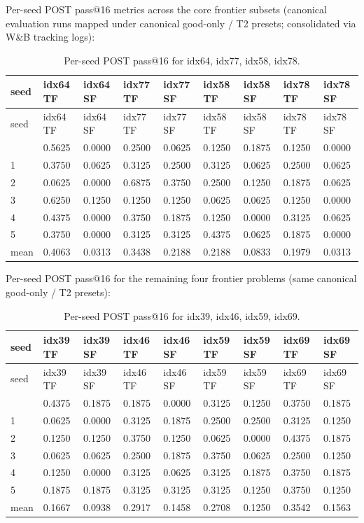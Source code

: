 Per-seed POST pass@16 metrics across the core frontier subsets (canonical evaluation runs mapped under canonical good-only / T2 presets; consolidated via W\&B tracking logs):

\begingroup\setlength{\tabcolsep}{3.5pt}
\begin{longtable}{lllllllll}
\caption{Per-seed POST pass@16 for idx64, idx77, idx58, idx78.}\\
\toprule
seed & idx64 TF & idx64 SF & idx77 TF & idx77 SF & idx58 TF & idx58 SF & idx78 TF & idx78 SF \\
\midrule
\endfirsthead
\toprule
seed & idx64 TF & idx64 SF & idx77 TF & idx77 SF & idx58 TF & idx58 SF & idx78 TF & idx78 SF \\
\midrule
\endhead
\bottomrule
\endfoot
0 & 0.5625 & 0.0000 & 0.2500 & 0.0625 & 0.1250 & 0.1875 & 0.1250 & 0.0000 \\
1 & 0.3750 & 0.0625 & 0.3125 & 0.2500 & 0.3125 & 0.0625 & 0.2500 & 0.0625 \\
2 & 0.0625 & 0.0000 & 0.6875 & 0.3750 & 0.2500 & 0.1250 & 0.1875 & 0.0625 \\
3 & 0.6250 & 0.1250 & 0.1250 & 0.1250 & 0.0625 & 0.0625 & 0.1250 & 0.0000 \\
4 & 0.4375 & 0.0000 & 0.3750 & 0.1875 & 0.1250 & 0.0000 & 0.3125 & 0.0625 \\
5 & 0.3750 & 0.0000 & 0.3125 & 0.3125 & 0.4375 & 0.0625 & 0.1875 & 0.0000 \\
mean & 0.4063 & 0.0313 & 0.3438 & 0.2188 & 0.2188 & 0.0833 & 0.1979 & 0.0313 \\
\end{longtable}\endgroup

Per-seed POST pass@16 for the remaining four frontier problems (same canonical good-only / T2 presets):

\begingroup\setlength{\tabcolsep}{3.5pt}
\begin{longtable}{lllllllll}
\caption{Per-seed POST pass@16 for idx39, idx46, idx59, idx69.}\\
\toprule
seed & idx39 TF & idx39 SF & idx46 TF & idx46 SF & idx59 TF & idx59 SF & idx69 TF & idx69 SF \\
\midrule
\endfirsthead
\toprule
seed & idx39 TF & idx39 SF & idx46 TF & idx46 SF & idx59 TF & idx59 SF & idx69 TF & idx69 SF \\
\midrule
\endhead
\bottomrule
\endfoot
0 & 0.4375 & 0.1875 & 0.1875 & 0.0000 & 0.3125 & 0.1250 & 0.3750 & 0.1875 \\
1 & 0.0625 & 0.0000 & 0.3125 & 0.1875 & 0.2500 & 0.2500 & 0.3125 & 0.1250 \\
2 & 0.1250 & 0.1250 & 0.3750 & 0.1250 & 0.0625 & 0.0000 & 0.4375 & 0.1875 \\
3 & 0.0625 & 0.0625 & 0.2500 & 0.1875 & 0.3750 & 0.0625 & 0.2500 & 0.1250 \\
4 & 0.1250 & 0.0000 & 0.3125 & 0.0625 & 0.3125 & 0.1875 & 0.3750 & 0.1875 \\
5 & 0.1875 & 0.1875 & 0.3125 & 0.3125 & 0.3125 & 0.1250 & 0.3750 & 0.1250 \\
mean & 0.1667 & 0.0938 & 0.2917 & 0.1458 & 0.2708 & 0.1250 & 0.3542 & 0.1563 \\
\end{longtable}\endgroup

